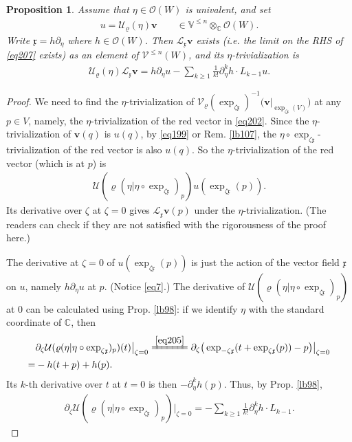 \documentclass[12pt,a4paper,notitlepage]{article}
\theoremstyle{definition}
\theoremstyle{plain}
\newtheorem{pp}[df]{Proposition}
\newcommand{\mc}{\mathcal}
\newcommand{\scr}{\mathscr}
\newcommand{\xk}{\mathfrak x}
\newcommand{\Vbb}{\mathbb V}
\newcommand{\Cbb}{\mathbb C}
\newcommand{\vbf}{\mathbf v}
\numberwithin{equation}{section}
\begin{document}
\subsection{}

\begin{pp}\label{lb108}
Assume that $\eta\in\scr O(W)$ is univalent, and set
\begin{align*}
u=\mc U_\varrho(\eta)\vbf\qquad\in\Vbb^{\leq n}\otimes_\Cbb\scr O(W).
\end{align*}
Write $\xk=h\partial_\eta$ where $h\in\scr O(W)$. Then $\mc L_\xk\vbf$ exists (i.e. the limit on the RHS of \eqref{eq207} exists) as an element of $\scr V^{\leq n}(W)$, and its $\eta$-trivialization is
\begin{align}
\mc U_\varrho(\eta)\mc L_\xk\vbf=h\partial_\eta u-\sum_{k\geq1} \frac 1{k!}\partial_\eta^k h\cdot L_{k-1}u.\label{eq204}
\end{align}
\end{pp}

\begin{proof}
We need to find the $\eta$-trivialization of $\mc V_\varrho(\exp_{\zeta\xk})^{-1}\big(\vbf\big|_{\exp_{\zeta\xk}(V)}\big)$ at any $p\in V$, namely, the $\eta$-trivialization of  the red vector in  \eqref{eq202}. Since the $\eta$-trivialization of $\vbf(q)$ is $u(q)$, by \eqref{eq199} or Rem. \ref{lb107}, the $\eta\circ\exp_{\zeta\xk}$-trivialization of the red vector is also $u(q)$. So the $\eta$-trivialization of the red vector (which is at $p$) is
\begin{align}
\mc U(\varrho(\eta|\eta\circ\exp_{\zeta\xk})_p)u(\exp_{\zeta\xk}(p))\label{eq203}.
\end{align}
Its derivative over $\zeta$ at $\zeta=0$ gives $\mc L_\xk\vbf(p)$ under the $\eta$-trivialization. (The readers can check \cite[Sec. 2.6]{Gui} if they are not satisfied with the rigorousness of the proof here.)

The derivative at $\zeta=0$ of $u(\exp_{\zeta\xk}(p))$ is just the action of the vector field $\xk$ on $u$, namely $h\partial_\eta u$ at $p$. (Notice \eqref{eq7}.) The derivative of $\mc U(\varrho(\eta|\eta\circ\exp_{\zeta\xk})_p)$ at $0$ can be calculated using Prop. \ref{lb98}: if we identify $\eta$ with the standard coordinate of $\Cbb$, then 
\begin{align*}
&\partial_\zeta\mc U(\varrho(\eta|\eta\circ\exp_{\zeta\xk})_p)(t)\big|_{\zeta=0}\xlongequal{\eqref{eq205}}\partial_\zeta\big(\exp_{-\zeta\xk}(t+\exp_{\zeta\xk}(p))-p\big)\big|_{\zeta=0}\\
=&-h(t+p)+h(p).
\end{align*}
Its $k$-th derivative over $t$ at $t=0$ is then $-\partial_\eta^kh(p)$. Thus, by Prop. \ref{lb98},
\begin{align*}
\partial_\zeta \mc U(\varrho(\eta|\eta\circ\exp_{\zeta\xk})_p)\big|_{\zeta=0}=-\sum_{k\geq1} \frac 1{k!}\partial_\eta^k h\cdot L_{k-1}.
\end{align*}
\end{proof}
\end{document}
